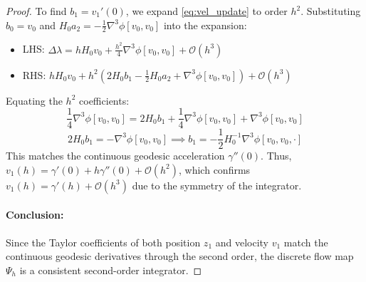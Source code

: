 \documentclass[11pt,a4paper]{article}
\begin{document}
\begin{proof}
To find $b_1 = v_1'(0)$, we expand \eqref{eq:vel_update} to order $h^2$. Substituting $b_0 = v_0$ and $H_0 a_2 = -\frac{1}{2}\nabla^3 \phi[v_0, v_0]$ into the expansion:
\begin{itemize}
    \item LHS: $\Delta \lambda = h H_0 v_0 + \frac{h^2}{4}\nabla^3 \phi[v_0, v_0] + \mathcal{O}(h^3)$
    \item RHS: $h H_0 v_0 + h^2 (2H_0 b_1 - \frac{1}{2}H_0 a_2 + \nabla^3 \phi[v_0, v_0]) + \mathcal{O}(h^3)$
\end{itemize}
Equating the $h^2$ coefficients:
\begin{equation}
    \frac{1}{4}\nabla^3 \phi[v_0, v_0] = 2H_0 b_1 + \frac{1}{4}\nabla^3 \phi[v_0, v_0] + \nabla^3 \phi[v_0, v_0]
\end{equation}
\begin{equation}
    2H_0 b_1 = -\nabla^3 \phi[v_0, v_0] \implies b_1 = -\frac{1}{2}H_0^{-1}\nabla^3 \phi[v_0, v_0, \cdot]
\end{equation}
This matches the continuous geodesic acceleration $\gamma''(0)$. Thus, $v_1(h) = \gamma'(0) + h \gamma''(0) + \mathcal{O}(h^2)$, which confirms $v_1(h) = \gamma'(h) + \mathcal{O}(h^3)$ due to the symmetry of the integrator.

\paragraph{Conclusion:}
Since the Taylor coefficients of both position $z_1$ and velocity $v_1$ match the continuous geodesic derivatives through the second order, the discrete flow map $\Psi_h$ is a consistent second-order integrator.
\end{proof}
\end{document}

